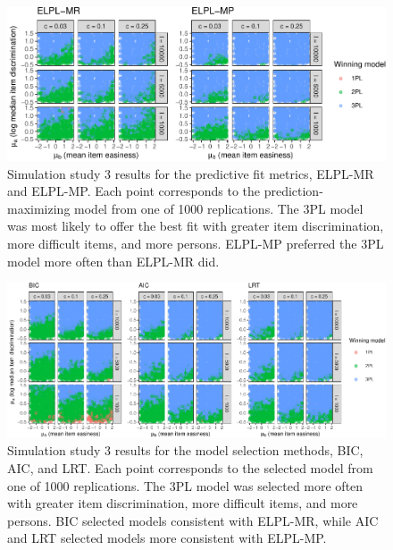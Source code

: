 \documentclass[
  english,
  man,floatsintext]{apa7}
\begin{document}
\begin{figure}

{\centering \includegraphics[width=2100px]{irt-predictive-fit-apa_files/figure-latex/results5b1-1}

}

\caption{Simulation study 3 results for the predictive fit metrics, ELPL-MR and ELPL-MP. Each point corresponds to the prediction-maximizing model from one of 1000 replications. The 3PL model was most likely to offer the best fit with greater item discrimination, more difficult items, and more persons. ELPL-MP preferred the 3PL model more often than ELPL-MR did.}\label{fig:results5b1}
\end{figure}

\begin{figure}

{\centering \includegraphics[width=2100px]{irt-predictive-fit-apa_files/figure-latex/results5b2-1}

}

\caption{Simulation study 3 results for the model selection methods, BIC, AIC, and LRT. Each point corresponds to the selected model from one of 1000 replications. The 3PL model was selected more often with greater item discrimination, more difficult items, and more persons. BIC selected models consistent with ELPL-MR, while AIC and LRT selected models more consistent with ELPL-MP.}\label{fig:results5b2}
\end{figure}
\end{document}
